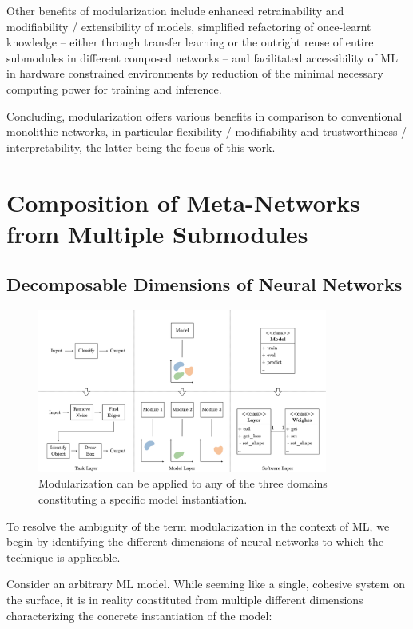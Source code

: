 \documentclass[conference]{IEEEtran}
\begin{document}
Other benefits of modularization include enhanced retrainability and modifiability / extensibility of models, simplified refactoring of once-learnt knowledge -- either through transfer learning or the outright reuse of entire submodules in different composed networks -- and facilitated accessibility of ML in hardware constrained environments by reduction of the minimal necessary computing power for training and inference.

Concluding, modularization offers various benefits in comparison to conventional monolithic networks, in particular flexibility / modifiability and trustworthiness / interpretability, the latter being the focus of this work.

\section{Composition of Meta-Networks from Multiple Submodules%
         \label{sec:compnet}}

\subsection{Decomposable Dimensions of Neural Networks%
            \label{sec:compnet_dimensions}}
            
\begin{figure}
    \centering
    \includegraphics[width=0.85\textwidth, trim=0 -25 0 -25, clip]{graphics/dimension.jpeg}
    \caption{Modularization can be applied to any of the three domains constituting a specific model instantiation.}
    \label{fig:compnet_dimensions}
\end{figure}

To resolve the ambiguity of the term modularization in the context of ML, we begin by identifying the different dimensions of neural networks to which the technique is applicable.

Consider an arbitrary ML model. While seeming like a single, cohesive system on the surface, it is in reality constituted from multiple different dimensions characterizing the concrete instantiation of the model:
\end{document}
